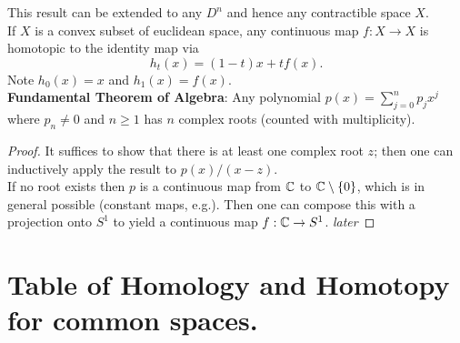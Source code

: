 \documentclass{amsart}
\begin{document}
	This result can be extended to any $D^n$ and hence any contractible space $X$.\\
	
	If $X$ is a convex subset of euclidean space, any continuous map $f:X\to X$ is homotopic to the identity map via
	$$
	h_t(x) = (1-t)x + tf(x).
	$$
	Note $h_0(x)=x$ and $h_1(x)=f(x)$.\\
	
	\textbf{Fundamental Theorem of Algebra}: Any polynomial $p(x)=\sum_{j=0}^n p_jx^j$ where $p_n\neq 0$ and $n\geq 1$ has $n$ complex roots (counted with multiplicity).
	\begin{proof}
		It suffices to show that there is at least one complex root $z$; then one can inductively apply the result to $p(x)/(x-z)$.\\
		
		If no root exists then $p$ is a continuous map from $\mathbb{C}$ to $\mathbb{C}\setminus \{0\}$, which is in general possible (constant maps, e.g.). Then one can compose this with a projection onto $S^1$ to yield a continuous map $f:\mathbb{C}\to S^1$. \textit{later}
	\end{proof} 
	
	\newpage
	
	\section{Table of Homology and Homotopy for common spaces.}
	
\end{document}
